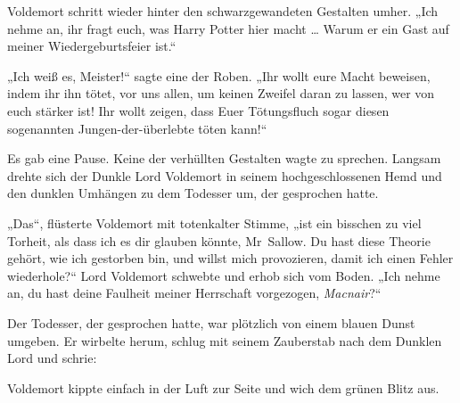 Voldemort schritt wieder hinter den schwarzgewandeten Gestalten umher.
„Ich nehme an, ihr fragt euch, was Harry Potter hier macht … Warum er ein Gast auf meiner Wiedergeburtsfeier ist.“

„Ich weiß es, Meister!“ sagte eine der Roben.
„Ihr wollt eure Macht beweisen, indem ihr ihn tötet, vor uns allen, um keinen Zweifel daran zu lassen, wer von euch stärker ist! Ihr wollt zeigen, dass Euer Tötungsfluch sogar diesen sogenannten Jungen-der-überlebte töten kann!“

Es gab eine Pause. Keine der verhüllten Gestalten wagte zu sprechen.
Langsam drehte sich der Dunkle Lord Voldemort in seinem hochgeschlossenen Hemd und den dunklen Umhängen zu dem Todesser um, der gesprochen hatte.

„Das“, flüsterte Voldemort mit totenkalter Stimme, „ist ein bisschen zu viel Torheit, als dass ich es dir glauben könnte, Mr~Sallow. Du hast diese Theorie gehört, wie ich gestorben bin, und willst mich provozieren, damit ich einen Fehler wiederhole?“
Lord Voldemort schwebte und erhob sich vom Boden.
„Ich nehme an, du hast deine Faulheit meiner Herrschaft vorgezogen, \emph{Macnair}?“

Der Todesser, der gesprochen hatte, war plötzlich von einem blauen Dunst umgeben. Er wirbelte herum, schlug mit seinem Zauberstab nach dem Dunklen Lord und schrie: 

Voldemort kippte einfach in der Luft zur Seite und wich dem grünen Blitz aus.

